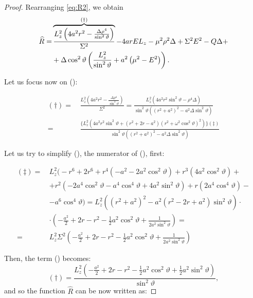 \begin{proof}
	Rearranging \autoref{eq:R2}, we obtain
	\begin{align}
	\widehat{R} =& \overbrace{\frac{L_z^2 \left(4a^2r^2 - \frac{\Delta\rho^4}{\sin^2\vartheta}\right)}{\Sigma^2}}^{\text{(\dag)}} - 4 a r E L_z - \mu^2 \rho^2 \Delta + \Sigma^2 E^2 - Q \Delta + \nonumber \\ 
	&+ \Delta\cos^2\vartheta\left(\frac{L_z^2}{\sin^2\vartheta} + a^2\left(\mu^2 - E^2\right)\right).
	\end{align}
	
	Let us focus now on (\dag):
	
	\begin{align}
	(\dag) =\,& \frac{L_z^2 \left(4a^2r^2 - \frac{\Delta\rho^4}{\sin^2\vartheta}\right)}{\Sigma^2} = \frac{L_z^2 \left(4a^2r^2\sin^2\vartheta - \rho^4\Delta \right)}{\sin^2\vartheta\left(\left(r^2+a^2\right)^2 - a^2\Delta\sin^2\vartheta\right)} \nonumber \\
	=\,& \frac{\Biggl\{L_z^2\left(4a^2r^2\sin^2\vartheta+\left(r^2+2r-a^2\right)\left(r^2+\omega^2\cos^2\vartheta\right)^2\right)\Biggr\}(\ddag)}{\sin^2\vartheta\left(\left(r^2+a^2\right)^2-a^2\Delta\sin^2\vartheta\right)}
	\end{align}
	
	Let us try to simplify (\ddag), the numerator of (\dag), first:
	
	\begin{align}
	(\ddag) =\,& L_z^2 \Biggl( -r^6 + 2r^6 + r^4 \left( -a^2 - 2a^2\cos^2\vartheta \right) + r^3\left(4 a^2 \cos^2\vartheta \right) + \nonumber \\
	&+ r^2 \left( -2a^4\cos^2\vartheta - a^4\cos^4\vartheta + 4a^2\sin^2\vartheta\right) + r\left(2a^4\cos^4\vartheta\right) - \nonumber \\
	&- a^6\cos^4\vartheta \Biggr) = L_z^2 \left( \left(r^2 + a^2\right)^2 - a^2 \left(r^2 - 2r + a^2\right)\sin^2\vartheta \right) \cdot \nonumber \\
	&\cdot \left( -\frac{a^2}{2} + 2r - r^2 - \frac{1}{2}a^2\cos^2\vartheta + \frac{1}{2a^2\sin^2\vartheta} \right) = \nonumber\\
	=\,& L_z^2 \Sigma^2 \left( -\frac{a^2}{2} + 2r - r^2 - \frac{1}{2}a^2\cos^2\vartheta + \frac{1}{2a^2\sin^2\vartheta} \right)
	\end{align}
	
	Then, the term (\dag) becomes:
	\[
	(\dag) = \frac{L_z^2 \left( -\frac{a^2}{2} + 2r - r^2 - \frac{1}{2}a^2\cos^2\vartheta + \frac{1}{2}a^2\sin^2\vartheta\right) }{\sin^2\vartheta},
	\]
	and so the function $\widehat{R}$ can be now written as:
	

\end{proof}
